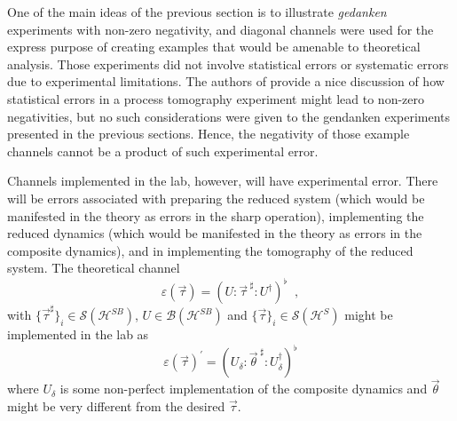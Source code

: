 One of the main ideas of the previous section is to illustrate {\em gedanken} experiments with non-zero negativity, and diagonal channels were used for the express purpose of creating examples that would be amenable to theoretical analysis.  Those experiments did not involve statistical errors or systematic errors due to experimental limitations.  The authors of \cite{Wood2009} provide a nice discussion of how statistical errors in a process tomography experiment might lead to non-zero negativities, but no such considerations were given to the gendanken experiments presented in the previous sections.  Hence, the negativity of those example channels cannot be a product of such experimental error.  

Channels implemented in the lab, however, will have experimental error.  There will be errors associated with preparing the reduced system (which would be manifested in the theory as errors in the sharp operation), implementing the reduced dynamics (which would be manifested in the theory as errors in the composite dynamics), and in implementing the tomography of the reduced system.  The theoretical channel
$$
\varepsilon(\vec{\tau})=\left(U:\vec{\tau}^{\;\sharp}:U^\dagger\right)^\flat\;\;,
$$
with $\{\vec{\tau}^\sharp\}_i\in\mathcal{S}(\mathcal{H}^{SB})$, $U\in\mathcal{B}(\mathcal{H}^{SB})$ and $\{\vec{\tau}\}_i\in\mathcal{S}(\mathcal{H}^{S})$ might be implemented in the lab as
$$
\varepsilon(\vec{\tau})^\prime = \left( U_\delta:\vec{\theta}^{\;\sharp}:U_\delta^\dagger\right)^\flat
$$
where $U_\delta$ is some non-perfect implementation of the composite dynamics and $\vec{\theta}$ might be very different from the desired $\vec{\tau}$.  

